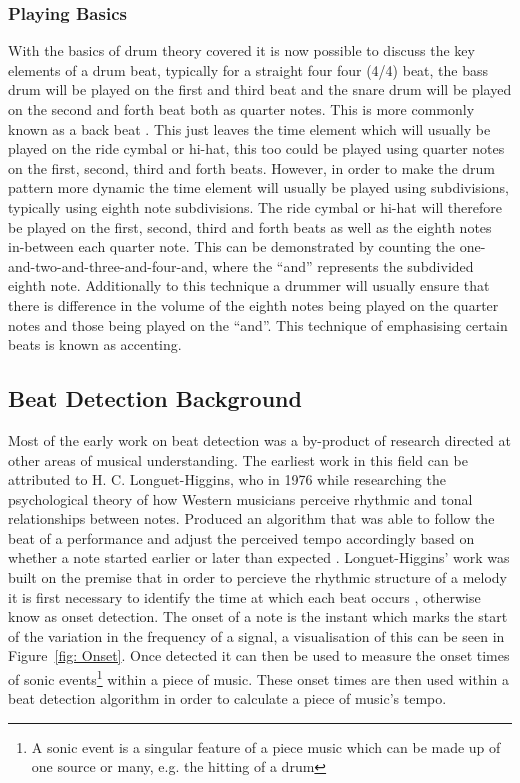 \documentclass[a4paper, 11pt]{article}
\begin{document}
\subsubsection{Playing Basics}
With the basics of drum theory covered it is now possible to discuss the key elements of a drum beat, typically for a straight four four (4/4) beat, the bass drum will be played on the first and third beat and the snare drum will be played on the second and forth beat both as quarter notes. This is more commonly known as a back beat \cite{drum-bible}. This just leaves the time element which will usually be played on the ride cymbal or hi-hat, this too could be played using quarter notes on the first, second, third and forth beats. However, in order to make the drum pattern more dynamic the time element will usually be played using subdivisions, typically using eighth note subdivisions. The ride cymbal or hi-hat will therefore be played on the first, second, third and forth beats as well as the eighth notes in-between each quarter note. This can be demonstrated by counting the one-and-two-and-three-and-four-and, where the ``and'' represents the subdivided eighth note. Additionally to this technique a drummer will usually ensure that there is difference in the volume of the eighth notes being played on the quarter notes and those being played on the ``and''. This technique of emphasising certain beats is known as accenting. 


\subsection{Beat Detection Background}
Most of the early work on beat detection was a by-product of research directed at other areas of musical understanding. The earliest work in this field can be attributed to H. C. Longuet-Higgins, who in 1976 while researching the psychological theory of how Western musicians perceive rhythmic and tonal relationships between notes. Produced an algorithm that was able to follow the beat of a performance and adjust the perceived tempo accordingly based on whether a note started earlier or later than expected \cite{allen-danneburg}. Longuet-Higgins' work was built on the premise that in order to percieve the rhythmic structure of a melody it is first necessary to identify the time at which each beat occurs \cite{longeut1}, otherwise know as onset detection. The onset of a note is the instant which marks the start of the variation in the frequency of a signal, a visualisation of this can be seen in Figure~\ref{fig: Onset}. Once detected it can then be used to measure the onset times of sonic events\footnote{A sonic event is a singular feature of a piece music which can be made up of one source or many\cite{sonic}, e.g. the hitting of a drum} within a piece of music\cite{mirex-onset}. These onset times are then used within a beat detection algorithm in order to calculate a piece of music's tempo. 
\end{document}

